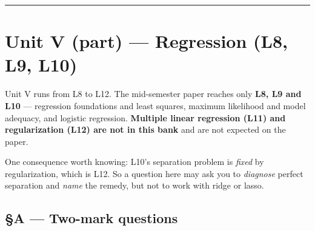 \documentclass[11pt,a4paper]{article}
\begin{document}
\vspace{0.4em}\hrule

\section*{Unit V (part) --- Regression \quad (L8, L9, L10)}

\begin{infobox}
Unit V runs from L8 to L12. The mid-semester paper reaches only \textbf{L8, L9
and L10} --- regression foundations and least squares, maximum likelihood and
model adequacy, and logistic regression. \textbf{Multiple linear regression
(L11) and regularization (L12) are not in this bank} and are not expected on
the paper.

One consequence worth knowing: L10's separation problem is \emph{fixed} by
regularization, which is L12. So a question here may ask you to \emph{diagnose}
perfect separation and \emph{name} the remedy, but not to work with ridge or
lasso.
\end{infobox}

\subsection*{§A --- Two-mark questions}
\end{document}
